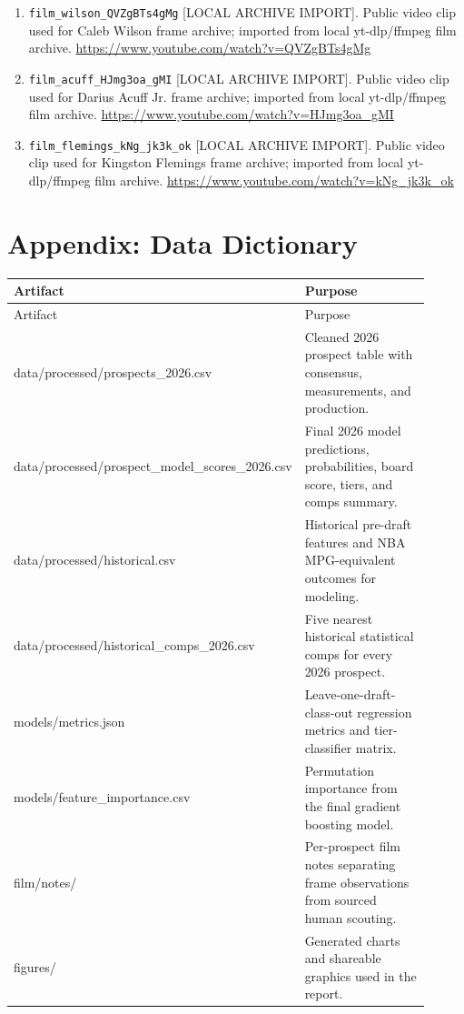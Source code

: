 \documentclass[11pt]{article}
\begin{document}
\begin{enumerate}[leftmargin=*, itemsep=2pt]
\item \texttt{film\_wilson\_QVZgBTs4gMg} [LOCAL ARCHIVE IMPORT]. Public video clip used for Caleb Wilson frame archive; imported from local yt-dlp/ffmpeg film archive. \url{https://www.youtube.com/watch?v=QVZgBTs4gMg}
\item \texttt{film\_acuff\_HJmg3oa\_gMI} [LOCAL ARCHIVE IMPORT]. Public video clip used for Darius Acuff Jr. frame archive; imported from local yt-dlp/ffmpeg film archive. \url{https://www.youtube.com/watch?v=HJmg3oa_gMI}
\item \texttt{film\_flemings\_kNg\_jk3k\_ok} [LOCAL ARCHIVE IMPORT]. Public video clip used for Kingston Flemings frame archive; imported from local yt-dlp/ffmpeg film archive. \url{https://www.youtube.com/watch?v=kNg_jk3k_ok}
\end{enumerate}
\normalsize


\section{Appendix: Data Dictionary}

\begin{center}
\small
\begin{longtable}{@{}>{\raggedright\arraybackslash}p{0.360\linewidth}>{\raggedright\arraybackslash}p{0.550\linewidth}@{}}
\toprule
Artifact & Purpose \\
\midrule
\endfirsthead
\toprule
Artifact & Purpose \\
\midrule
\endhead
data/processed/prospects\_2026.csv & Cleaned 2026 prospect table with consensus, measurements, and production. \\
data/processed/prospect\_model\_scores\_2026.csv & Final 2026 model predictions, probabilities, board score, tiers, and comps summary. \\
data/processed/historical.csv & Historical pre-draft features and NBA MPG-equivalent outcomes for modeling. \\
data/processed/historical\_comps\_2026.csv & Five nearest historical statistical comps for every 2026 prospect. \\
models/metrics.json & Leave-one-draft-class-out regression metrics and tier-classifier matrix. \\
models/feature\_importance.csv & Permutation importance from the final gradient boosting model. \\
film/notes/ & Per-prospect film notes separating frame observations from sourced human scouting. \\
figures/ & Generated charts and shareable graphics used in the report. \\
\bottomrule
\end{longtable}
\end{center}
\end{document}
